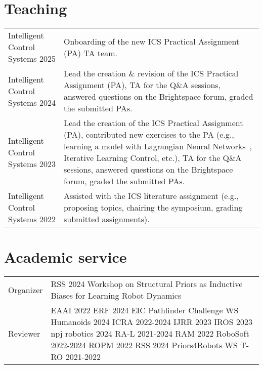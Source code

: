 \section*{Teaching}
\noindent
\begin{longtable}{p{} p{}}
    Intelligent Control \newline Systems 2025 & Onboarding of the new ICS Practical Assignment (PA) TA team.\\
    Intelligent Control \newline Systems 2024 & Lead the creation \& revision of the ICS Practical Assignment (PA), TA for the Q\&A sessions, answered questions on the Brightspace forum, graded the submitted PAs.\\
    Intelligent Control \newline Systems 2023 & Lead the creation of the ICS Practical Assignment (PA), contributed new exercises to the PA (e.g., learning a model with Lagrangian Neural Networks~\cite{lutter2019deep}, Iterative Learning Control, etc.), TA for the Q\&A sessions, answered questions on the Brightspace forum, graded the submitted PAs.\\
    Intelligent Control \newline Systems 2022 & Assisted with the ICS literature assignment (e.g., proposing topics, chairing the symposium, grading submitted assignments).\\
\end{longtable}

\section*{Academic service}
\noindent
\begin{longtable}{p{} p{}}
    Organizer & RSS 2024 Workshop on Structural Priors as Inductive Biases for Learning Robot Dynamics\\
    Reviewer & 
        EAAI 2022 \newline
        ERF 2024 EIC Pathfinder Challenge WS \newline
        Humanoids 2024 \newline
        ICRA 2022-2024 \newline 
        IJRR 2023 \newline
        IROS 2023 \newline
        npj robotics 2024 \newline
        RA-L 2021-2024 \newline
        RAM 2022 \newline
        RoboSoft 2022-2024 \newline
        ROPM 2022 \newline
        RSS 2024 Priors4Robots WS \newline
        T-RO 2021-2022
    \\
\end{longtable}